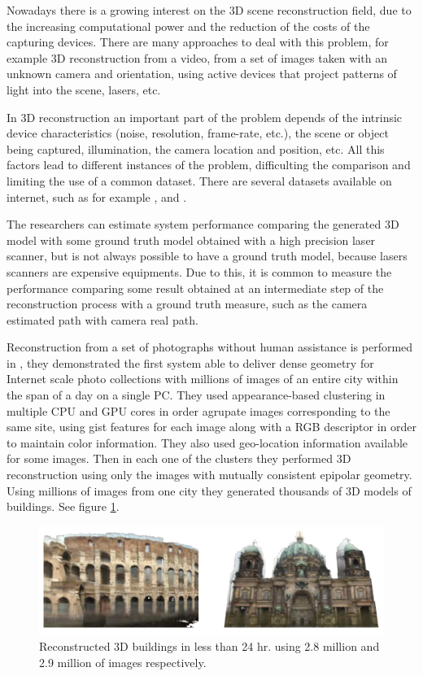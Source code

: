  
Nowadays there is a growing interest on the 3D scene reconstruction field, due to the increasing computational power and the reduction of 
the costs of the capturing devices. There are many approaches to deal with this problem, for example 3D reconstruction 
from a video, from a set of images taken with an unknown camera and orientation, using active devices that project patterns of light into 
the scene, lasers, etc. 

In 3D reconstruction an important part of the problem depends of the intrinsic 
device characteristics (noise, resolution, frame-rate, etc.), the scene or object being captured, illumination, the camera location and position, etc. All this 
factors lead to different instances of the problem, difficulting the comparison and limiting the use of a common dataset. There are several datasets 
available on internet, such as for example \cite{sturm12iros},  \cite{LaiBRF11} and \cite{ShottonGZICF13}.

The researchers can estimate system performance comparing the generated 3D model with some 
ground truth model obtained with a high precision laser scanner, but is not always possible to have a ground truth model, because lasers scanners 
are expensive equipments. Due to this, it is common to measure the performance
 comparing some result obtained at an intermediate step of the reconstruction process with a ground truth measure, 
such as the camera estimated path with camera real path.   

Reconstruction from a set of photographs without human assistance is performed in \cite{jan}, they demonstrated the first system able to deliver dense geometry for Internet scale photo collections with millions of images of an entire city within the span of a day on a single PC. They used appearance-based clustering in multiple CPU and GPU cores 
in order agrupate images corresponding to the same site, using gist features for each image along with a RGB
descriptor in order to maintain color information. They also used geo-location information available for some  images. 
Then in each one of the clusters they performed 3D reconstruction using only the images with mutually consistent epipolar 
geometry. Using millions of images from one city they generated thousands of 3D models of buildings. See figure \ref{fig:jan}. 


\begin{figure}[h!]
\begin{center}
\includegraphics[scale=0.25]{images/jan}
\caption{Reconstructed 3D buildings in less than 24 hr. using 2.8 million and 2.9 million of images respectively.}
\label{fig:jan}
\end{center}
\end{figure}

